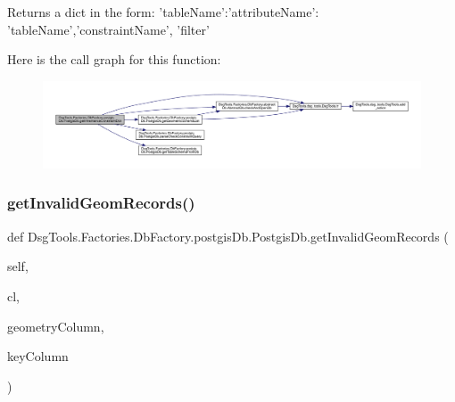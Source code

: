 \begin{DoxyVerb}Returns a dict in the form:
    {'tableName':{'attributeName': {'tableName','constraintName', 'filter'} 
}
    }
\end{DoxyVerb}
 Here is the call graph for this function\+:
\nopagebreak
\begin{figure}[H]
\begin{center}
\leavevmode
\includegraphics[width=350pt]{class_dsg_tools_1_1_factories_1_1_db_factory_1_1postgis_db_1_1_postgis_db_a29ffcba875e47469dd6de1c3c0ddfd25_cgraph}
\end{center}
\end{figure}
\mbox{\label{class_dsg_tools_1_1_factories_1_1_db_factory_1_1postgis_db_1_1_postgis_db_af5a32689ca7097b712de34e08408c323}} 
\subsubsection{\texorpdfstring{get\+Invalid\+Geom\+Records()}{getInvalidGeomRecords()}}
{\footnotesize\ttfamily def Dsg\+Tools.\+Factories.\+Db\+Factory.\+postgis\+Db.\+Postgis\+Db.\+get\+Invalid\+Geom\+Records (\begin{DoxyParamCaption}\item[{}]{self,  }\item[{}]{cl,  }\item[{}]{geometry\+Column,  }\item[{}]{key\+Column }\end{DoxyParamCaption})}

